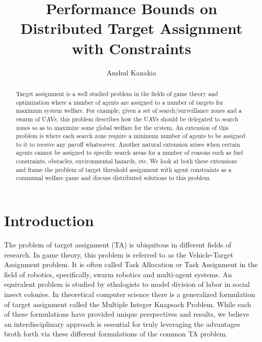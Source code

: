 \documentclass[11pt, onecolumn, compsoc, letterpaper]{article}
\title{Performance Bounds on Distributed Target Assignment with Constraints}
\author{Anshul Kanakia}
\date{}
\begin{document}
\maketitle

\begin{abstract}
Target assignment is a well studied problem in the fields of game theory and optimization where a number of agents are assigned to a number of targets for maximum system welfare. For example, given a set of search/surveillance zones and a swarm of UAVs, this problem describes how the UAVs should be delegated to search zones so as to maximize some global welfare for the system. An extension of this problem is where each search zone require a minimum number of agents to be assigned to it to receive any payoff whatsoever. Another natural extension arises when certain agents cannot be assigned to specific search areas for a number of reasons such as fuel constraints, obstacles, environmental hazards, etc. We look at both these extensions and frame the problem of target threshold assignment with agent constraints as a communal welfare game and discuss distributed solutions to this problem.
\end{abstract}

\section{Introduction}
The problem of target assignment (TA) is ubiquitous in different fields of research. In game theory, this problem is referred to as the Vehicle-Target Assignment problem. It is often called Task Allocation or Task Assignment in the field of robotics, specifically, swarm robotics and multi-agent systems. An equivalent problem is studied by ethologists to model division of labor in social insect colonies. In theoretical computer science there is a generalized formulation of target assignment called the Multiple Integer Knapsack Problem. While each of these formulations have provided unique perspectives and results, we believe an interdisciplinary approach is essential for truly leveraging the advantages broth forth via these different formulations of the common TA problem.
\end{document}
